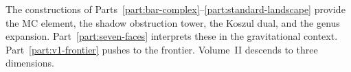 \medskip\noindent
The constructions of Parts~\ref{part:bar-complex}--\ref{part:standard-landscape} provide the MC element, the
shadow obstruction tower, the Koszul dual, and the genus expansion. Part~\ref{part:seven-faces}
interprets these in the gravitational context. Part~\ref{part:v1-frontier} pushes
to the frontier. Volume~II descends to three dimensions.
